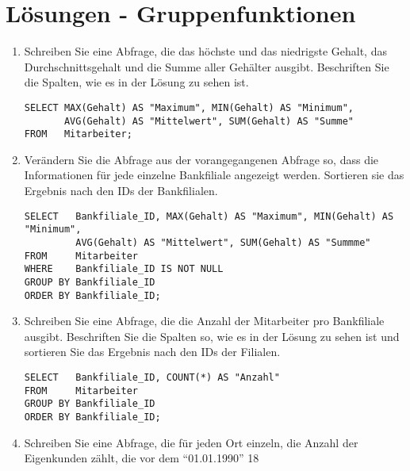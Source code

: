 \clearpage
    \section{Lösungen - Gruppenfunktionen}
      \begin{enumerate}
        \item Schreiben Sie eine Abfrage, die das höchste und das niedrigste
        Gehalt, das Durchschnittsgehalt und die Summe aller Gehälter ausgibt.
        Beschriften Sie die Spalten, wie es in der Lösung zu sehen ist.
        \begin{msoraclesql}[\FALSE]
        \end{msoraclesql}
        \begin{lstlisting}[language=oracle_sql]
SELECT MAX(Gehalt) AS "Maximum", MIN(Gehalt) AS "Minimum",
       AVG(Gehalt) AS "Mittelwert", SUM(Gehalt) AS "Summe"
FROM   Mitarbeiter;
        \end{lstlisting}
        \item Verändern Sie die Abfrage aus der vorangegangenen Abfrage so,
        dass die Informationen für jede einzelne Bankfiliale angezeigt werden.
        Sortieren sie das Ergebnis nach den IDs der Bankfilialen.
        \begin{msoraclesql}[\FALSE]
        \end{msoraclesql}
        \begin{lstlisting}[language=oracle_sql]
SELECT   Bankfiliale_ID, MAX(Gehalt) AS "Maximum", MIN(Gehalt) AS "Minimum",
         AVG(Gehalt) AS "Mittelwert", SUM(Gehalt) AS "Summme"
FROM     Mitarbeiter
WHERE    Bankfiliale_ID IS NOT NULL
GROUP BY Bankfiliale_ID
ORDER BY Bankfiliale_ID;
        \end{lstlisting}
        \item Schreiben Sie eine Abfrage, die die Anzahl der Mitarbeiter pro
        Bankfiliale ausgibt. Beschriften Sie die Spalten so, wie es in der
        Lösung zu sehen ist und sortieren Sie das Ergebnis nach den IDs der
        Filialen.
        \begin{msoraclesql}[\FALSE]
        \end{msoraclesql}
        \begin{lstlisting}[language=oracle_sql]
SELECT   Bankfiliale_ID, COUNT(*) AS "Anzahl"
FROM     Mitarbeiter
GROUP BY Bankfiliale_ID
ORDER BY Bankfiliale_ID;
        \end{lstlisting}
        \item Schreiben Sie eine Abfrage, die für jeden Ort einzeln, die
        Anzahl der Eigenkunden zählt, die vor dem \enquote{01.01.1990} 18

\end{enumerate}

